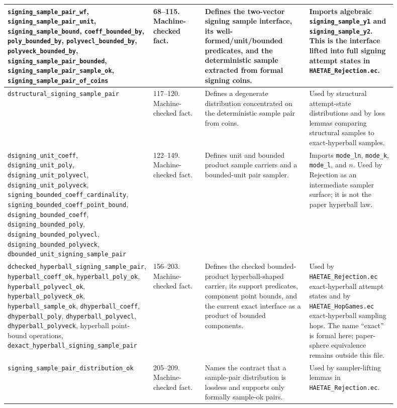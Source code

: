 \documentclass[11pt]{report}
\DeclareRobustCommand{\file}[1]{\ifmmode\text{\nolinkurl{#1}}\else\nolinkurl{#1}\fi}
\DeclareRobustCommand{\ec}[1]{\ifmmode\text{\nolinkurl{#1}}\else\nolinkurl{#1}\fi}
\theoremstyle{definition}
\theoremstyle{plain}
\begin{document}
{\begin{longtable}{p{0.25\linewidth}p{0.14\linewidth}p{0.28\linewidth}p{0.23\linewidth}}
\ec{signing\_sample\_pair\_wf},
\ec{signing\_sample\_pair\_unit},
\ec{signing\_sample\_bound},
\ec{coeff\_bounded\_by}, \ec{poly\_bounded\_by},
\ec{polyvecl\_bounded\_by}, \ec{polyveck\_bounded\_by},
\ec{signing\_sample\_pair\_bounded},
\ec{signing\_sample\_pair\_sample\_ok},
\ec{signing\_sample\_pair\_of\_coins} &
68--115. Machine-checked fact. &
Defines the two-vector signing sample interface, its well-formed/unit/bounded
predicates, and the deterministic sample extracted from formal signing coins. &
Imports algebraic \ec{signing\_sample\_y1} and
\ec{signing\_sample\_y2}.  This is the interface lifted into full signing
attempt states in \file{HAETAE\_Rejection.ec}. \\
\midrule
\ec{dstructural\_signing\_sample\_pair} &
117--120. Machine-checked fact. &
Defines a degenerate distribution concentrated on the deterministic sample
pair from coins. &
Used by structural attempt-state distributions and by loss lemmas comparing
structural samples to exact-hyperball samples. \\
\midrule
\ec{dsigning\_unit\_coeff}, \ec{dsigning\_unit\_poly},
\ec{dsigning\_unit\_polyvecl}, \ec{dsigning\_unit\_polyveck},
\ec{signing\_bounded\_coeff\_cardinality},
\ec{signing\_bounded\_coeff\_point\_bound},
\ec{dsigning\_bounded\_coeff}, \ec{dsigning\_bounded\_poly},
\ec{dsigning\_bounded\_polyvecl}, \ec{dsigning\_bounded\_polyveck},
\ec{dbounded\_unit\_signing\_sample\_pair} &
122--149. Machine-checked fact. &
Defines unit and bounded product sample carriers and a bounded-unit pair
sampler. &
Imports \ec{mode\_ln}, \ec{mode\_k}, \ec{mode\_l}, and \(n\).  Used by
Rejection as an intermediate sampler surface; it is not the paper hyperball
law. \\
\midrule
\ec{dchecked\_hyperball\_signing\_sample\_pair},
\ec{hyperball\_coeff\_ok}, \ec{hyperball\_poly\_ok},
\ec{hyperball\_polyvecl\_ok}, \ec{hyperball\_polyveck\_ok},
\ec{hyperball\_sample\_ok}, \ec{dhyperball\_coeff},
\ec{dhyperball\_poly}, \ec{dhyperball\_polyvecl},
\ec{dhyperball\_polyveck}, hyperball point-bound operations,
\ec{dexact\_hyperball\_signing\_sample\_pair} &
156--203. Machine-checked fact. &
Defines the checked bounded-product hyperball-shaped carrier, its support
predicates, component point bounds, and the current exact interface as a
product of bounded components. &
Used by \file{HAETAE\_Rejection.ec} exact-hyperball attempt states and by
\file{HAETAE\_HopGames.ec} exact-hyperball sampling hops.  The name
``exact'' is formal here; paper-sphere equivalence remains outside this file. \\
\midrule
\ec{signing\_sample\_pair\_distribution\_ok} &
205--209. Machine-checked fact. &
Names the contract that a sample-pair distribution is lossless and supports
only formally sample-ok pairs. &
Used by sampler-lifting lemmas in \file{HAETAE\_Rejection.ec}. \\
\bottomrule
\end{longtable}
}
\end{document}
